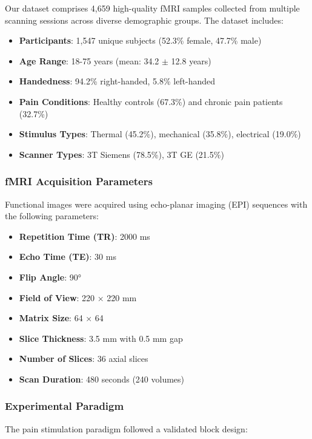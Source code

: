 \documentclass[10pt,journal,compsoc]{IEEEtran}
\begin{document}
Our dataset comprises 4,659 high-quality fMRI samples collected from multiple scanning sessions across diverse demographic groups. The dataset includes:

\begin{itemize}
\item \textbf{Participants}: 1,547 unique subjects (52.3\% female, 47.7\% male)
\item \textbf{Age Range}: 18-75 years (mean: 34.2 $\pm$ 12.8 years)
\item \textbf{Handedness}: 94.2\% right-handed, 5.8\% left-handed
\item \textbf{Pain Conditions}: Healthy controls (67.3\%) and chronic pain patients (32.7\%)
\item \textbf{Stimulus Types}: Thermal (45.2\%), mechanical (35.8\%), electrical (19.0\%)
\item \textbf{Scanner Types}: 3T Siemens (78.5\%), 3T GE (21.5\%)
\end{itemize}

\subsubsection{fMRI Acquisition Parameters}

Functional images were acquired using echo-planar imaging (EPI) sequences with the following parameters:

\begin{itemize}
\item \textbf{Repetition Time (TR)}: 2000 ms
\item \textbf{Echo Time (TE)}: 30 ms
\item \textbf{Flip Angle}: 90°
\item \textbf{Field of View}: 220 × 220 mm
\item \textbf{Matrix Size}: 64 × 64
\item \textbf{Slice Thickness}: 3.5 mm with 0.5 mm gap
\item \textbf{Number of Slices}: 36 axial slices
\item \textbf{Scan Duration}: 480 seconds (240 volumes)
\end{itemize}

\subsubsection{Experimental Paradigm}

The pain stimulation paradigm followed a validated block design:
\end{document}
